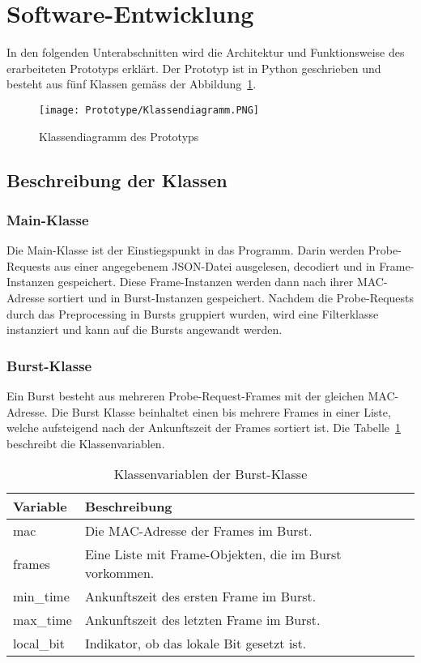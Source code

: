 \section{Software-Entwicklung
\label{section:softwareengineering}}
In den folgenden Unterabschnitten wird die Architektur und Funktionsweise
des erarbeiteten Prototyps erklärt. Der Prototyp ist in Python geschrieben und
besteht aus fünf Klassen gemäss der Abbildung~\ref{figure:prototypearchitecture}.

\begin{figure}[h!]
	\centering
	\texttt{[image: Prototype/Klassendiagramm.PNG]}
    \caption{Klassendiagramm des Prototyps
	\label{figure:prototypearchitecture}}
\end{figure}

\subsection{Beschreibung der Klassen}
\subsubsection*{Main-Klasse}
Die Main-Klasse ist der Einstiegspunkt in das Programm. 
Darin werden Probe-Requests aus einer angegebenem JSON-Datei ausgelesen,
decodiert und in Frame-Instanzen gespeichert. 
Diese Frame-Instanzen werden dann nach ihrer MAC-Adresse sortiert und 
in Burst-Instanzen gespeichert.
Nachdem die Probe-Requests durch das Preprocessing in Bursts gruppiert wurden,
wird eine Filterklasse instanziert und kann auf die Bursts angewandt werden.

\clearpage 

\subsubsection*{Burst-Klasse}
Ein Burst besteht aus mehreren Probe-Request-Frames mit der gleichen 
MAC-Adresse.
Die Burst Klasse beinhaltet einen bis mehrere Frames in einer Liste, 
welche aufsteigend nach der Ankunftszeit der Frames sortiert ist.
Die Tabelle~\ref{table:burstfields} beschreibt die Klassenvariablen.

\begin{table}[h!]
    \centering
    \begin{tabular}{|l|l|}
        \hline
        \textbf{Variable} & \textbf{Beschreibung} \\
        \hline 
        mac & Die MAC-Adresse der Frames im Burst. \\
        \hline
        frames & Eine Liste mit Frame-Objekten, die im Burst vorkommen. \\
        \hline
        min\_time & Ankunftszeit des ersten Frame im Burst. \\
        \hline
        max\_time & Ankunftszeit des letzten Frame im Burst. \\
        \hline
        local\_bit & Indikator, ob das lokale Bit gesetzt ist. \\
        \hline
    \end{tabular}
    \caption{Klassenvariablen der Burst-Klasse
    \label{table:burstfields}}  
\end{table}

